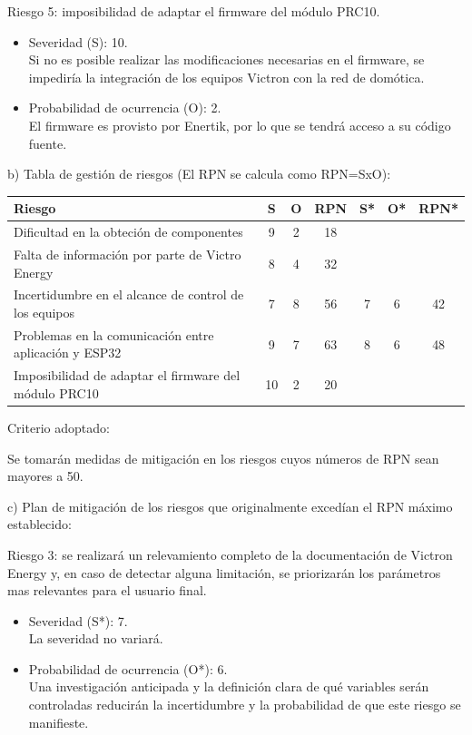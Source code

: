 \documentclass[
11pt, %
]{charter}
\begin{document}
Riesgo 5: imposibilidad de adaptar el firmware del módulo PRC10.
\begin{itemize}
	\item Severidad (S): 10.\\
	Si no es posible realizar las modificaciones necesarias en el firmware, se impediría la integración de los equipos Victron con la red de domótica.
	\item Probabilidad de ocurrencia (O): 2.\\
	 El firmware es provisto por Enertik, por lo que se tendrá acceso a su código fuente.
\end{itemize}

b) Tabla de gestión de riesgos      (El RPN se calcula como RPN=SxO):

\begin{table}[htpb]
\centering
\begin{tabularx}{\linewidth}{@{}|X|c|c|c|c|c|c|@{}}
\hline
\rowcolor[HTML]{C0C0C0} 
Riesgo & S & O & RPN & S* & O* & RPN* \\ \hline
Dificultad en la obteción de componentes       &  9 & 2  &  18   &    &    &      \\ \hline
Falta de información por parte de Victro Energy       &  8 &  4 &  32   &    &    &      \\ \hline
Incertidumbre en el alcance de control de los equipos       & 7  & 8  & 56    &   7 & 6   & 42     \\ \hline
Problemas en la comunicación entre aplicación y ESP32       &  9 & 7  & 63    &  8  & 6   & 48     \\ \hline
Imposibilidad de adaptar el firmware del módulo PRC10       & 10  & 2  & 20    &    &    &      \\ \hline
\end{tabularx}%
\end{table}

Criterio adoptado: 

Se tomarán medidas de mitigación en los riesgos cuyos números de RPN sean mayores a 50.

c) Plan de mitigación de los riesgos que originalmente excedían el RPN máximo establecido:
 
Riesgo 3: se realizará un relevamiento completo de la documentación de Victron Energy y, en caso de detectar alguna limitación, se priorizarán los parámetros mas relevantes para el usuario final.
 
  \begin{itemize}
	\item Severidad (S*): 7.\\
          La severidad no variará.
	\item Probabilidad de ocurrencia (O*): 6.\\
          Una investigación anticipada y la definición clara de qué variables serán controladas reducirán la incertidumbre y la probabilidad de que este riesgo se manifieste.
	\end{itemize}
	
\end{document}
